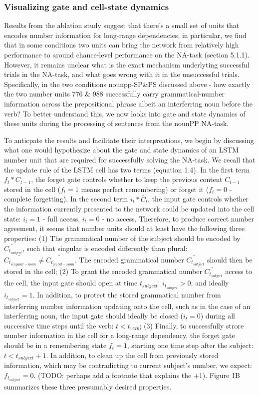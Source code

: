 \subsubsection{Visualizing gate and cell-state dynamics}
Results from the ablation study suggest that there's a small set of units that encodes number information for long-range dependencies, in particular, we find that in some conditions two units can bring the network from relatively high performance to around chance-level performance on the NA-task (section 5.1.1). However, it remains unclear what is the exact mechanism underlyting successful trials in the NA-task, and what goes wrong with it in the unsuccessful trials. Specifically, in the two conditions nounpp-SP\&PS discussed above - how exactly the two number units 776 \& 988 successfully carry grammatical-number information across the prepositional phrase albeit an interferring noun before the verb? To better understand this, we now looks into gate and state dynamics of these units during the processing of sentences from the nounPP NA-task. 

To anticpate the results and facilitate their interpreations, we begin by discussing what one would hypothesize about the gate and state dynamics of an LSTM number unit that are required for successfully solving the NA-task. We recall that the update rule of the LSTM cell has two terms (equation 1.4). In the first term $f_t * C_{t-1}$, the forget gate controls whether to keep the previous content $C_{t-1}$ stored in the cell ($f_t=1$ means perfect remembering) or forget it ($f_t=0$ - complete forgetting). In the second term $i_t*\tilde{C_t}$, the input gate controls whether the information currently presented to the network could be updated into the cell state: $i_t=1$ - full access, $i_t=0$ - no access. Therefore, to produce correct number agreement, it seems that number units should at least have the following three properties: (1) The grammatical number of the subject should be encoded by $\tilde{C_t_{subject}}$, such that singular is encoded differently than plural: $\tilde{C_{t_{singular-noun}}}\neq\tilde{C_{t_{plural-noun}}}$. The encoded grammatical number $\tilde{C_t_{subject}}$ should then be stored in the cell; (2) To grant the encoded grammatical number $\tilde{C_t_{subject}}$ access to the cell, the input gate should open at time $t_{subject}$: $i_{t_{subject}}>0$, and ideally $i_{t_{subject}}=1$. In addition, to protect the stored grammatical number from interferring number information updating onto the cell, such as in the case of an interferring noun, the input gate should ideally be closed ($i_t=0$) during all successive time steps until the verb: $t<t_{verb}$; (3) Finally, to successfully strore number information in the cell for a long-range dependency, the forget gate should be in a remembering state $f_t=1$, starting one time step after the subject: $t<t_{subject}+1$. In addition, to clean up the cell from previously stored information, which may be contradicting to current subject's number, we expect: $f_{t_{subject}}=0$. (TODO: perhaps add a footnote that explains the +1). Figure 1B summarizes these three presumably desired properties.

